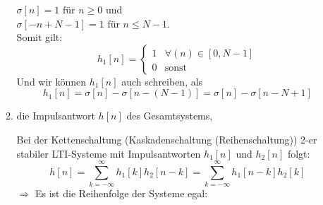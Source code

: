 \begin{uebsp}
\begin{Answer}
\begin{enumerate}[a)]
\begin{enumerate}
                $\sigma[n]=1\text{ für }n\geq0$ und \\
                $\sigma[-n+N-1]=1\text{ für }n\leq N-1$.\\
                Somit gilt:
                \[h_1[n]=\begin{cases}1&\forall (n)\in [0,N-1]\\0&\text{sonst}\end{cases}\]
                Und wir können $h_1[n]$ auch schreiben, als
                \[h_1[n]=\sigma[n]-\sigma[n-(N-1)]=\sigma[n]-\sigma[n-N+1]\]
            \item die Impulsantwort $h[n]$ des Gesamtsystems,
                \begin{uebsp_theory}
                    Bei der Kettenschaltung (Kaskadenschaltung (Reihenschaltung)) 2-er 
                    stabiler LTI-Systeme mit Impulsantworten $h_1[n]$ und $h_2[n]$ folgt:
                    \[h[n]=\sum_{k=-\infty}^\infty h_1[k]h_2[n-k]=\sum_{k=-\infty}^\infty h_1[n-k]h_2[k]\]
                    $\Rightarrow$ Es ist die Reihenfolge der Systeme egal:
                    \begin{center}
\end{center}
\end{uebsp_theory}
\end{enumerate}
\end{enumerate}
\end{Answer}
\end{uebsp}
